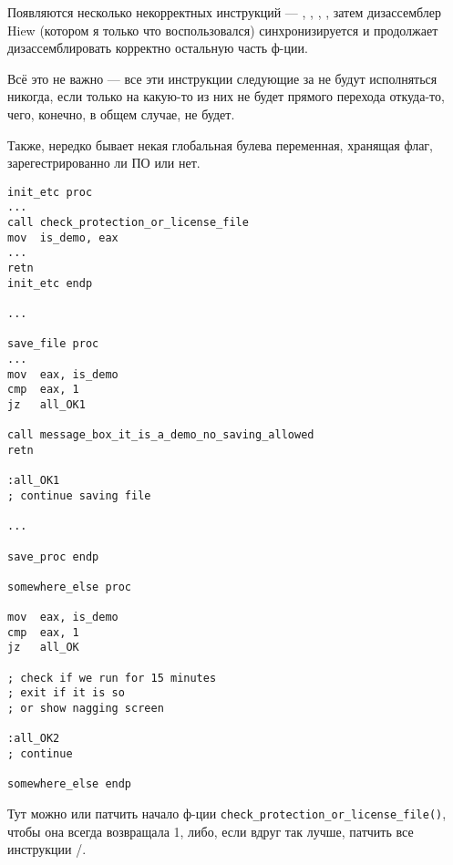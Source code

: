 Появляются несколько некорректных инструкций --- , , , ,
затем дизассемблер Hiew (котором я только что воспользовался)
синхронизируется и продолжает дизассемблировать корректно остальную часть ф-ции.

Всё это не важно --- все эти инструкции следующие за  не будут исполняться никогда, если только на какую-то из них не будет прямого
перехода откуда-то, чего, конечно, в общем случае, не будет.

\myhrule{}

Также, нередко бывает некая глобальная булева переменная, хранящая флаг, зарегестрированно ли ПО или нет.

\begin{lstlisting}[style=customasmx86]
init_etc proc
...
call check_protection_or_license_file
mov  is_demo, eax
...
retn
init_etc endp

...

save_file proc
...
mov  eax, is_demo
cmp  eax, 1
jz   all_OK1

call message_box_it_is_a_demo_no_saving_allowed
retn

:all_OK1
; continue saving file

...

save_proc endp

somewhere_else proc

mov  eax, is_demo
cmp  eax, 1
jz   all_OK

; check if we run for 15 minutes
; exit if it is so
; or show nagging screen

:all_OK2
; continue

somewhere_else endp
\end{lstlisting}

Тут можно или патчить начало ф-ции \verb|check_protection_or_license_file()|,
чтобы она всегда возвращала 1, либо, если вдруг так лучше,
патчить все инструкции /.


